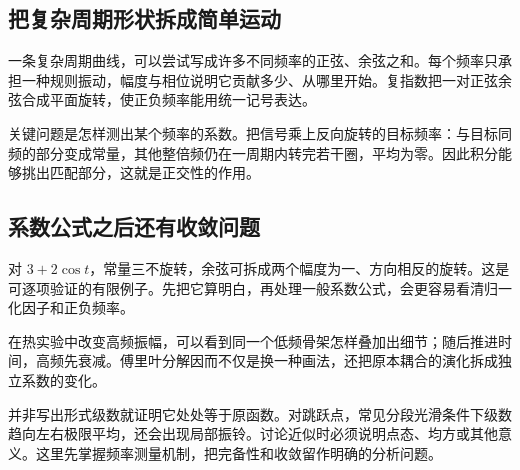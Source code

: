 \subsection*{把复杂周期形状拆成简单运动}
一条复杂周期曲线，可以尝试写成许多不同频率的正弦、余弦之和。每个频率只承担一种规则振动，幅度与相位说明它贡献多少、从哪里开始。复指数把一对正弦余弦合成平面旋转，使正负频率能用统一记号表达。

关键问题是怎样测出某个频率的系数。把信号乘上反向旋转的目标频率：与目标同频的部分变成常量，其他整倍频仍在一周期内转完若干圈，平均为零。因此积分能够挑出匹配部分，这就是正交性的作用。

\subsection*{系数公式之后还有收敛问题}
对 $3+2\cos t$，常量三不旋转，余弦可拆成两个幅度为一、方向相反的旋转。这是可逐项验证的有限例子。先把它算明白，再处理一般系数公式，会更容易看清归一化因子和正负频率。

在热实验中改变高频振幅，可以看到同一个低频骨架怎样叠加出细节；随后推进时间，高频先衰减。傅里叶分解因而不仅是换一种画法，还把原本耦合的演化拆成独立系数的变化。

并非写出形式级数就证明它处处等于原函数。对跳跃点，常见分段光滑条件下级数趋向左右极限平均，还会出现局部振铃。讨论近似时必须说明点态、均方或其他意义。这里先掌握频率测量机制，把完备性和收敛留作明确的分析问题。
